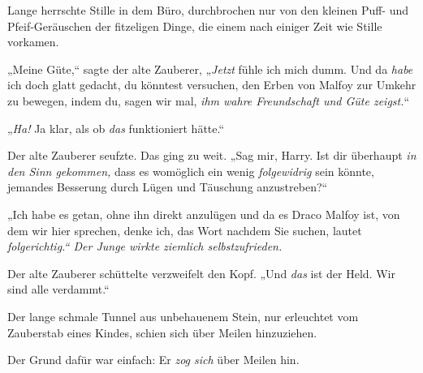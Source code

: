 Lange herrschte Stille in dem Büro, durchbrochen nur von den kleinen Puff- und Pfeif-Geräuschen der fitzeligen Dinge, die einem nach einiger Zeit wie Stille vorkamen.

„Meine Güte,“ sagte der alte Zauberer, „\emph{Jetzt} fühle ich mich dumm. Und da \emph{habe} ich doch glatt gedacht, du könntest versuchen, den Erben von Malfoy zur Umkehr zu bewegen, indem du, sagen wir mal, \emph{ihm wahre Freundschaft und Güte zeigst.}“

„\emph{Ha!} Ja klar, als ob \emph{das} funktioniert hätte.“

Der alte Zauberer seufzte. Das ging zu weit. „Sag mir, Harry. Ist dir überhaupt \emph{in den Sinn gekommen,} dass es womöglich ein wenig \emph{folgewidrig} sein könnte, jemandes Besserung durch Lügen und Täuschung anzustreben?“

„Ich habe es getan, ohne ihn direkt anzulügen und da es Draco Malfoy ist, von dem wir hier sprechen, denke ich, das Wort nachdem Sie suchen, lautet \emph{folgerichtig.“ Der Junge wirkte ziemlich selbstzufrieden.}

Der alte Zauberer schüttelte verzweifelt den Kopf. „Und \emph{das} ist der Held. Wir sind alle verdammt.“


Der lange schmale Tunnel aus unbehauenem Stein, nur erleuchtet vom Zauberstab eines Kindes, schien sich über Meilen hinzuziehen.

Der Grund dafür war einfach: Er \emph{zog sich} über Meilen hin.

